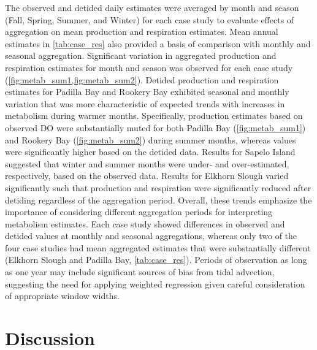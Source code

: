 \documentclass[letterpaper,12pt,oneside]{article}\usepackage[]{graphicx}\usepackage[]{color}
\begin{document}
The observed and detided daily estimates were averaged by month and season (Fall, Spring, Summer, and Winter) for each case study to evaluate effects of aggregation on mean production and respiration estimates.  Mean annual estimates in \cref{tab:case_res} also provided a basis of comparison with monthly and seasonal aggregation. Significant variation in aggregated production and respiration estimates for month and season was observed for each case study (\cref{fig:metab_sum1,fig:metab_sum2}).  Detided production and respiration estimates for Padilla Bay and Rookery Bay exhibited seasonal and monthly variation that was more characteristic of expected trends with increases in metabolism during warmer months.  Specifically, production estimates based on observed \ac{DO} were substantially muted for both Padilla Bay (\cref{fig:metab_sum1}) and Rookery Bay (\cref{fig:metab_sum2}) during summer months, whereas values were significantly higher based on the detided data. Results for Sapelo Island suggested that winter and summer months were under- and over-estimated, respectively, based on the observed data.  Results for Elkhorn Slough varied significantly such that production and respiration were significantly reduced after detiding regardless of the aggregation period.  Overall, these trends emphasize the importance of considering different aggregation periods for interpreting metabolism estimates.  Each case study showed differences in observed and detided values at monthly and seasonal aggregations, whereas only two of the four case studies had mean aggregated estimates that were substantially different (Elkhorn Slough and Padilla Bay, \cref{tab:case_res}).  Periods of observation as long as one year may include significant sources of bias from tidal advection, suggesting the need for applying weighted regression given careful consideration of appropriate window widths.       

 

\section{Discussion}
\end{document}
